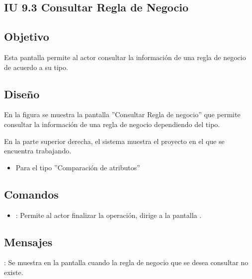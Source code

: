 \subsection{IU 9.3 Consultar Regla de Negocio}

\subsection{Objetivo}
	Esta pantalla permite al actor consultar la información de una regla de negocio de acuerdo a su tipo.
\subsection{Diseño}
	En la figura  se muestra la pantalla ''Consultar Regla de negocio'' que permite consultar la información de una regla de negocio dependiendo del tipo.
	
	
	En la parte superior derecha, el sistema muestra el proyecto en el que se encuentra trabajando.
	\begin{itemize}
		\item Para el tipo ''Comparación de atributos''
	\end{itemize}
\subsection{Comandos}
\begin{itemize}
	\item {}: Permite al actor finalizar la operación, dirige a la pantalla .
\end{itemize}

\subsection{Mensajes}

\begin{Citemize}
	\item {}: Se muestra en la pantalla  cuando la regla de negocio que se desea consultar no existe.
\end{Citemize}
